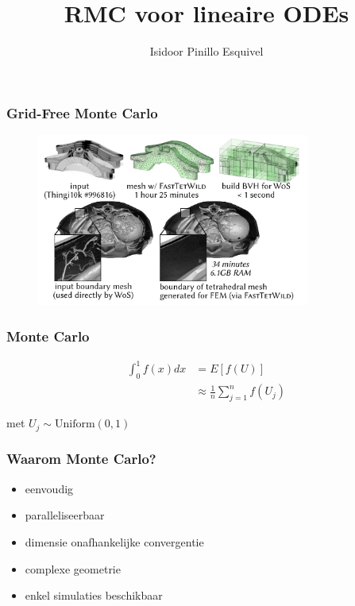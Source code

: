 \documentclass[20pt]{beamer}
\title{RMC voor lineaire ODEs}
\author{Isidoor Pinillo Esquivel }
\date{}
\begin{document}
\begin{frame}
    \titlepage
\end{frame}
\begin{frame}
    \frametitle{Grid-Free Monte Carlo}
    \cite{sawhney_grid-free_2022}
    \begin{figure}[h!]
        \centering
        \includegraphics[width=0.8\textwidth]{imgs/Grid_free_comparison.jpg}
        \label{fig:grid_free_comparison}
    \end{figure}
\end{frame}

\begin{frame}
    \frametitle{Monte Carlo}
    \vspace{-1cm}
    \begin{align}
        \int_{0}^{1} f(x) dx & = E[f(U)]                                   \\
                             & \approx \frac{1}{n} \sum_{j=1}^{n} f(U_{j})
    \end{align}
    \begin{center}
        met $U_{j} \sim \text{Uniform}(0,1)$
    \end{center}
\end{frame}

\begin{frame}
    \frametitle{Waarom Monte Carlo?}
    \begin{itemize}
        \item eenvoudig
        \item paralleliseerbaar
        \item dimensie onafhankelijke convergentie
        \item complexe geometrie
        \item enkel simulaties beschikbaar
    \end{itemize}
\end{frame}
\end{document}
